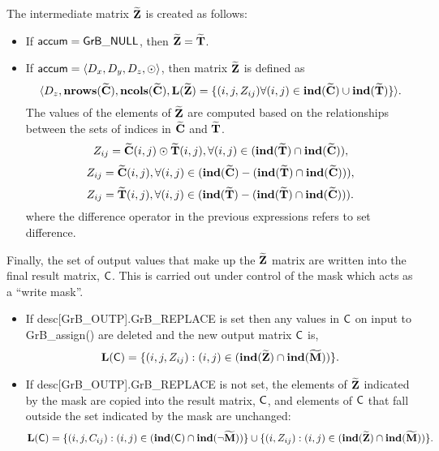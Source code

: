 The intermediate matrix ${\bf \widetilde{Z}}$ is created as follows:
\begin{itemize}
    \item If ${\sf accum} = {\sf GrB\_NULL}$, then ${\bf \widetilde{Z}} = {\bf \widetilde{T}}$.

    \item If ${\sf accum} = \langle D_x, D_y, D_z, \odot \rangle$, then matrix ${\bf \widetilde{Z}}$ is defined as 
        \[ \langle D_z, \bold{nrows}({\bf \widetilde{C}}),\bold{ncols}({\bf \widetilde{C}}), \bold{L}({\bf \widetilde{Z}})
		= \{(i,j,Z_{ij})  \forall (i,j) \in \bold{ind}({\bf \widetilde{C}}) \cup 
        \bold{ind}({\bf \widetilde{T}}) \} \rangle.\]
    The values of the elements of ${\bf \widetilde{Z}}$ are computed based on the relationships between the sets of indices in ${\bf \widetilde{C}}$ and ${\bf \widetilde{T}}$.
\[
	Z_{ij} = {\bf \widetilde{C}}(i,j) \odot {\bf \widetilde{T}}(i,j), \forall (i,j) \in  (\bold{ind}({\bf \widetilde{T}}) \cap \bold{ind}({\bf \widetilde{C}})),
\]
\[
	Z_{ij} = {\bf \widetilde{C}}(i,j), \forall  (i,j) \in  (\bold{ind}({\bf \widetilde{C}}) - (\bold{ind}({\bf \widetilde{T}}) \cap \bold{ind}({\bf \widetilde{C}}))),
\]
\[
	Z_{ij} = {\bf \widetilde{T}}(i,j), \forall  (i,j) \in  (\bold{ind}({\bf \widetilde{T}}) - (\bold{ind}({\bf \widetilde{T}}) \cap \bold{ind}({\bf \widetilde{C}}))).
\]
where the difference operator in the previous expressions refers to set difference.
\end{itemize}

Finally, the set of output values that make up the ${\bf \widetilde{Z}}$ 
matrix are written into the final result matrix, ${\sf C}$. 
This is carried out under control of the mask which acts as a ``write mask''.
\begin{itemize}
\item If {\sf desc[GrB\_OUTP].GrB\_REPLACE} is set then any values in ${\sf C}$ 
on input to {\sf GrB\_assign()} are deleted and the new output matrix ${\sf C}$ is,
		\[ \bold{L}({\sf C}) = \{(i,j,Z_{ij}) : (i,j) \in (\bold{ind}({\bf \widetilde{Z}}) 
\cap \bold{ind}({\bf \widetilde{M}})) \}. \]

\item If {\sf desc[GrB\_OUTP].GrB\_REPLACE} is not set, the elements of ${\bf \widetilde{Z}}$ indicated by 
the mask are copied into the result matrix, ${\sf C}$, and elements of 
${\sf C}$ that fall outside the set indicated by the mask are unchanged:
		\[ \bold{L}({\sf C}) = \{(i,j,C_{ij}) : (i,j) \in (\bold{ind}({\bf \sf C}) 
		\cap \bold{ind}(\neg {\bf \widetilde{M}})) \} \cup \{(i,Z_{ij}) : (i,j) \in 
(\bold{ind}({\bf \widetilde{Z}}) \cap \bold{ind}({\bf \widetilde{M}})) \}. \]
\end{itemize}

